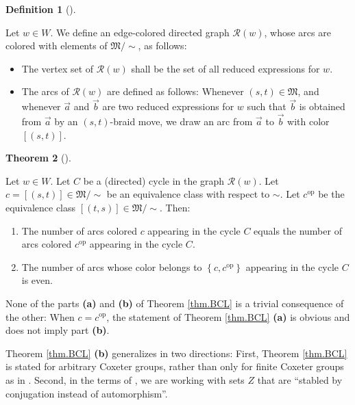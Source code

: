 \documentclass
[numbers=enddot,12pt,final,onecolumn,notitlepage,abstracton]{scrartcl}%
\theoremstyle{definition}
\newtheorem{theo}{Theorem}[section]
\newenvironment{theorem}[1][]
{\begin{theo}[#1]\begin{leftbar}}
{\end{leftbar}\end{theo}}
\newtheorem{defi}[theo]{Definition}
\newenvironment{definition}[1][]
{\begin{defi}[#1]\begin{leftbar}}
{\end{leftbar}\end{defi}}
\begin{document}
\begin{definition}
\label{def.R}Let $w\in W$. We define an edge-colored directed graph
$\mathcal{R}\left(  w\right)  $, whose arcs are colored with elements of
$\mathfrak{M}/\sim$, as follows:

\begin{itemize}
\item The vertex set of $\mathcal{R}\left(  w\right)  $ shall be the set of
all reduced expressions for $w$.

\item The arcs of $\mathcal{R}\left(  w\right)  $ are defined as follows:
Whenever $\left(  s,t\right)  \in\mathfrak{M}$, and whenever
$\overrightarrow{a}$ and $\overrightarrow{b}$ are two reduced expressions for
$w$ such that $\overrightarrow{b}$ is obtained from $\overrightarrow{a}$ by an
$\left(  s,t\right)  $-braid move, we draw an arc from $\overrightarrow{a}$ to
$\overrightarrow{b}$ with color $\left[  \left(  s,t\right)  \right]  $.
\end{itemize}
\end{definition}

\begin{theorem}
\label{thm.BCL}Let $w\in W$. Let $C$ be a (directed) cycle in the graph
$\mathcal{R}\left(  w\right)  $. Let $c=\left[  \left(  s,t\right)  \right]
\in\mathfrak{M}/\sim$ be an equivalence class with respect to $\sim$. Let
$c^{\operatorname*{op}}$ be the equivalence class $\left[  \left(  t,s\right)
\right]  \in\mathfrak{M}/\sim$. Then:

\begin{enumerate}
\item[\textbf{(a)}] The number of arcs colored $c$ appearing in the cycle $C$
equals the number of arcs colored $c^{\operatorname*{op}}$ appearing in the
cycle $C$.

\item[\textbf{(b)}] The number of arcs whose color belongs to $\left\{
c,c^{\operatorname*{op}}\right\}  $ appearing in the cycle $C$ is even.
\end{enumerate}
\end{theorem}

None of the parts \textbf{(a)} and \textbf{(b)} of Theorem \ref{thm.BCL} is a
trivial consequence of the other: When $c=c^{\operatorname*{op}}$, the
statement of Theorem \ref{thm.BCL} \textbf{(a)} is obvious and does not imply
part \textbf{(b)}.

Theorem \ref{thm.BCL} \textbf{(b)} generalizes \cite[Theorem 3.1]{BCL} in two
directions: First, Theorem \ref{thm.BCL} is stated for arbitrary Coxeter
groups, rather than only for finite Coxeter groups as in \cite{BCL}. Second,
in the terms of \cite[Remark 3.3]{BCL}, we are working with sets $Z$ that are
\textquotedblleft stabled by conjugation instead of
automorphism\textquotedblright.
\end{document}
